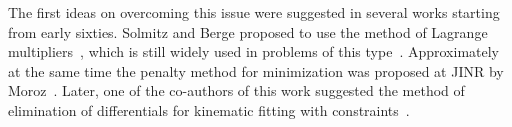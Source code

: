 
The first ideas on overcoming this issue were suggested in several works starting from early sixties.
Solmitz and Berge proposed to use the method of Lagrange multipliers~\cite{b1}, which is still widely used in problems of this type~\cite{b4}. %
Approximately at the same time the penalty method for minimization was proposed at JINR by Moroz~\cite{b5}.
Later, one of the co-authors of this work suggested the method of elimination of differentials for kinematic fitting with constraints~\cite{b6}.
